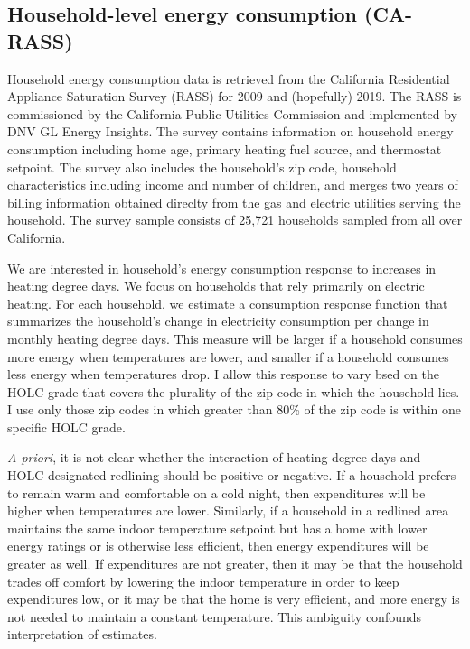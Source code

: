\documentclass[
]{article}
\begin{document}
\hypertarget{household-level-energy-consumption-ca-rass}{%
\subsection{Household-level energy consumption (CA-RASS)}\label{household-level-energy-consumption-ca-rass}}

Household energy consumption data is retrieved from the California Residential Appliance Saturation Survey (RASS) for 2009 and (hopefully) 2019. The RASS
is commissioned by the California Public Utilities Commission and implemented by DNV GL Energy Insights. The survey contains information on household
energy consumption including home age, primary heating fuel source, and thermostat setpoint. The survey also includes the household's zip code,
household characteristics including income and number of children, and merges two years of billing information obtained direclty from the gas and electric
utilities serving the household. The survey sample consists of 25,721 households sampled from all over California.

We are interested in household's energy consumption response to increases in heating degree days. We focus on households that rely primarily on electric heating. For each household, we
estimate a consumption response function that summarizes the household's change in electricity consumption per change in monthly heating degree days.
This measure will be larger if a household consumes more energy when temperatures are lower, and smaller if a household consumes less energy when temperatures drop.
I allow this response to vary bsed on the HOLC grade that covers the plurality of the zip code in which the household lies. I use only those zip codes in which greater than 80\%
of the zip code is within one specific HOLC grade.

\emph{A priori}, it is not clear whether the interaction of heating degree days and HOLC-designated redlining should be positive or negative. If a household
prefers to remain warm and comfortable on a cold night, then expenditures will be higher when temperatures are lower. Similarly, if a household in a redlined area
maintains the same indoor temperature setpoint but has a home with lower energy ratings or is otherwise less efficient, then energy expenditures will be greater as well.
If expenditures are not greater, then it may be that the household trades off comfort by lowering the indoor temperature in order to keep expenditures low, or
it may be that the home is very efficient, and more energy is not needed to maintain a constant temperature. This ambiguity confounds interpretation of estimates.
\end{document}
